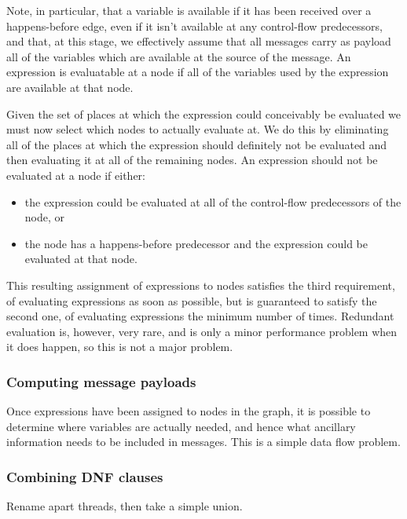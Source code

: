 Note, in particular, that a variable is available if it has been received over a happens-before edge, even if it isn't available at any control-flow predecessors, and that, at this stage, we effectively assume that all messages carry as payload all of the variables which are available at the source of the message.
An expression is evaluatable at a node if all of the variables used by the expression are available at that node.

Given the set of places at which the expression could conceivably be evaluated we must now select which nodes to actually evaluate at.
We do this by eliminating all of the places at which the expression should definitely not be evaluated and then evaluating it at all of the remaining nodes.
An expression should not be evaluated at a node if either:

\begin{itemize}
\item the expression could be evaluated at all of the control-flow predecessors of the node, or
\item the node has a happens-before predecessor and the expression could be evaluated at that node.
\end{itemize}

This resulting assignment of expressions to nodes satisfies the third requirement, of evaluating expressions as soon as possible, but is guaranteed to satisfy the second one, of evaluating expressions the minimum number of times.
Redundant evaluation is, however, very rare, and is only a minor performance problem when it does happen, so this is not a major problem.

\subsubsection{Computing message payloads}

Once expressions have been assigned to nodes in the graph, it is possible to determine where variables are actually needed, and hence what ancillary information needs to be included in messages.
This is a simple data flow problem.


\subsubsection{Combining DNF clauses}
Rename apart threads, then take a simple union.

